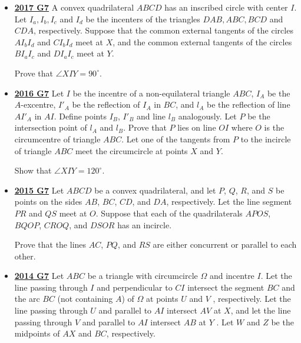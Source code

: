 \documentclass[11pt]{scrartcl}
\begin{document}
\begin{itemize}[leftmargin=*]
Prove that the circumcircle of triangle formed by $\ell_A$, $\ell_B$, and $\ell_C$ is tangent to the line $OP$.
\item \href{https://artofproblemsolving.com/community/c6h1671266p10632269}{\textbf{2017 G7}} A convex quadrilateral $ABCD$ has an inscribed circle with center $I$. Let $I_a, I_b, I_c$ and $I_d$ be the incenters of the triangles $DAB, ABC, BCD$ and $CDA$, respectively. Suppose that the common external tangents of the circles $AI_bI_d$ and $CI_bI_d$ meet at $X$, and the common external tangents of the circles $BI_aI_c$ and $DI_aI_c$ meet at $Y$. 

Prove that $\angle{XIY}=90^{\circ}$.



\item \href{https://artofproblemsolving.com/community/c6h1480720p8639324}{\textbf{2016 G7}} 	Let $I$ be the incentre of a non-equilateral triangle $ABC$, $I_A$ be the $A$-excentre, $I'_A$ be the reflection of $I_A$ in $BC$, and $l_A$ be the reflection of line $AI'_A$ in $AI$. Define points $I_B$, $I'_B$ and line $l_B$ analogously. Let $P$ be the intersection point of $l_A$ and $l_B$. Prove that $P$ lies on line $OI$ where $O$ is the circumcentre of triangle $ABC$. Let one of the tangents from $P$ to the incircle of triangle $ABC$ meet the circumcircle at points $X$ and $Y$. 

Show that $\angle XIY = 120^{\circ}$.
\item \href{https://artofproblemsolving.com/community/c6h1268837p6622082}{\textbf{2015 G7}} 	Let $ABCD$ be a convex quadrilateral, and let $P$, $Q$, $R$, and $S$ be points on the sides $AB$, $BC$, $CD$, and $DA$, respectively. Let the line segment $PR$ and $QS$ meet at $O$. Suppose that each of the quadrilaterals $APOS$, $BQOP$, $CROQ$, and $DSOR$ has an incircle. 

Prove that the lines $AC$, $PQ$, and $RS$ are either concurrent or parallel to each other.
\item \href{https://artofproblemsolving.com/community/c6h1113194p5083564}{\textbf{2014 G7}} Let $ABC$ be a triangle with circumcircle $\Omega$ and incentre $I$. Let the line passing through $I$ and perpendicular to $CI$ intersect the segment $BC$ and the arc $BC$ (not containing $A$) of $\Omega$ at points $U$ and $V$ , respectively. Let the line passing through $U$ and parallel to $AI$ intersect $AV$ at $X$, and let the line passing through $V$ and parallel to $AI$ intersect $AB$ at $Y$ . Let $W$ and $Z$ be the midpoints of $AX$ and $BC$, respectively. 


\end{itemize}
\end{document}
